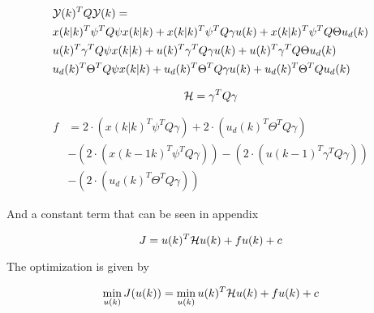 \begin{equation}
	\begin{aligned}
	&\CMcal{Y}(k)^TQ\CMcal{Y}(k) = \\
	& x(k|k)^T\psi ^T Q \psi x(k|k) + x(k|k)^T \psi ^T Q \gamma u(k) + x(k|k)^T \psi ^T Q \Theta u_d(k) \\
	& u(k)^T \gamma ^T Q \psi x(k|k) +  u(k)^T \gamma ^T Q \gamma u(k) + u(k)^T \gamma ^T Q\Theta  u_d(k)\\ 
	&  u_d(k)^T \Theta ^T Q  \psi x(k|k)+u_d(k)^T \Theta ^T Q \gamma u(k) +u_d(k)^T \Theta ^T Q u_d(k)
	\end{aligned}
\end{equation}



\begin{equation}
	\CMcal{H} = \gamma^T Q\gamma 
\end{equation}

\begin{equation}
	\begin{aligned}
	f &= 2\cdot(x(k|k)^T\psi^T Q \gamma )+2\cdot(u_d(k)^T\Theta^TQ\gamma ) \\
	  &-(2\cdot(x(k-1k)^T\psi^T Q \gamma ))-(2\cdot(u(k-1)^T\gamma^TQ\gamma )) \\
	  &-(2\cdot(u_d(k)^T\Theta^TQ\gamma ))
	\end{aligned}
\end{equation}

And a constant term that can be seen in appendix

\begin{equation}
	J =  u(k)^T\CMcal{H} u(k)+ f u(k)+ c
\end{equation}

The optimization is given by

\begin{equation}
	\min_{u(k)} J(u(k)) =\min_{u(k)} u(k)^T\CMcal{H}u(k)+fu(k)+c
\end{equation}